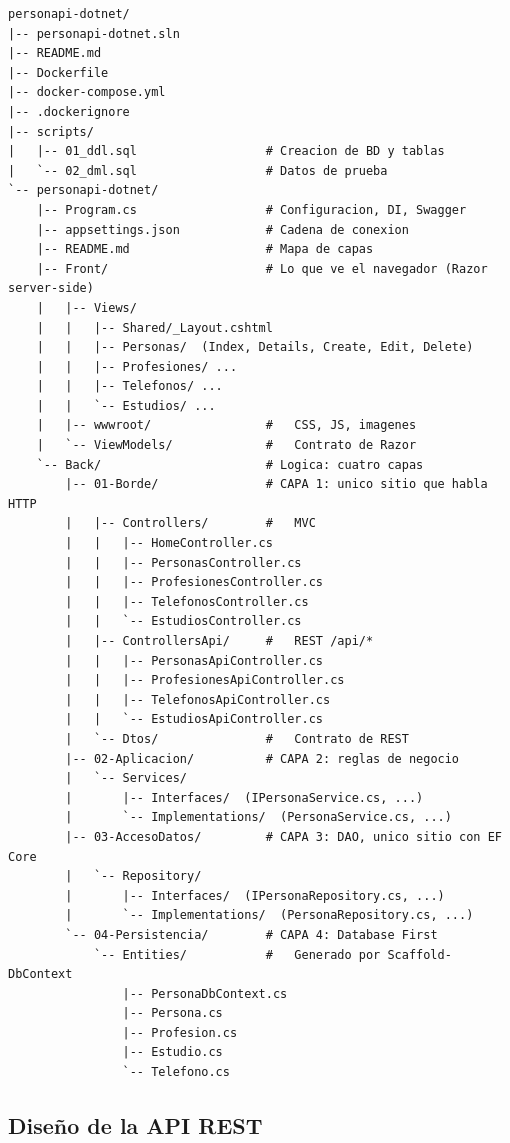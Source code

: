 \documentclass[12pt,letterpaper]{article}
\begin{document}
\begin{lstlisting}[language={},numbers=none,caption={Estructura de carpetas del repositorio.}]
personapi-dotnet/
|-- personapi-dotnet.sln
|-- README.md
|-- Dockerfile
|-- docker-compose.yml
|-- .dockerignore
|-- scripts/
|   |-- 01_ddl.sql                  # Creacion de BD y tablas
|   `-- 02_dml.sql                  # Datos de prueba
`-- personapi-dotnet/
    |-- Program.cs                  # Configuracion, DI, Swagger
    |-- appsettings.json            # Cadena de conexion
    |-- README.md                   # Mapa de capas
    |-- Front/                      # Lo que ve el navegador (Razor server-side)
    |   |-- Views/
    |   |   |-- Shared/_Layout.cshtml
    |   |   |-- Personas/  (Index, Details, Create, Edit, Delete)
    |   |   |-- Profesiones/ ...
    |   |   |-- Telefonos/ ...
    |   |   `-- Estudios/ ...
    |   |-- wwwroot/                #   CSS, JS, imagenes
    |   `-- ViewModels/             #   Contrato de Razor
    `-- Back/                       # Logica: cuatro capas
        |-- 01-Borde/               # CAPA 1: unico sitio que habla HTTP
        |   |-- Controllers/        #   MVC
        |   |   |-- HomeController.cs
        |   |   |-- PersonasController.cs
        |   |   |-- ProfesionesController.cs
        |   |   |-- TelefonosController.cs
        |   |   `-- EstudiosController.cs
        |   |-- ControllersApi/     #   REST /api/*
        |   |   |-- PersonasApiController.cs
        |   |   |-- ProfesionesApiController.cs
        |   |   |-- TelefonosApiController.cs
        |   |   `-- EstudiosApiController.cs
        |   `-- Dtos/               #   Contrato de REST
        |-- 02-Aplicacion/          # CAPA 2: reglas de negocio
        |   `-- Services/
        |       |-- Interfaces/  (IPersonaService.cs, ...)
        |       `-- Implementations/  (PersonaService.cs, ...)
        |-- 03-AccesoDatos/         # CAPA 3: DAO, unico sitio con EF Core
        |   `-- Repository/
        |       |-- Interfaces/  (IPersonaRepository.cs, ...)
        |       `-- Implementations/  (PersonaRepository.cs, ...)
        `-- 04-Persistencia/        # CAPA 4: Database First
            `-- Entities/           #   Generado por Scaffold-DbContext
                |-- PersonaDbContext.cs
                |-- Persona.cs
                |-- Profesion.cs
                |-- Estudio.cs
                `-- Telefono.cs
\end{lstlisting}

\subsection{Diseño de la API REST}
\end{document}
